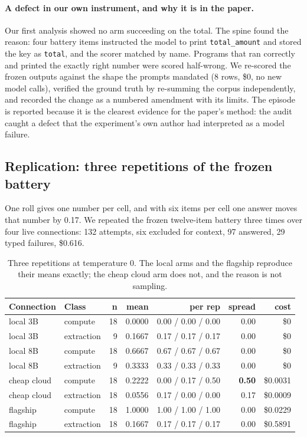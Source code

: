\documentclass[11pt]{article}
\newcommand{\code}[1]{\texttt{#1}}
\begin{document}
\paragraph{A defect in our own instrument, and why it is in the paper.} Our first analysis showed
no arm succeeding on the total. The spine found the reason: four battery items instructed the
model to print \code{total\_amount} and stored the key as \code{total}, and the scorer matched by
name. Programs that ran correctly and printed the exactly right number were scored half-wrong.
We re-scored the frozen outputs against the shape the prompts mandated (8 rows, \$0, no new model
calls), verified the ground truth by re-summing the corpus independently, and recorded the change
as a numbered amendment with its limits. The episode is reported because it is the clearest
evidence for the paper's method: the audit caught a defect that the experiment's own author had
interpreted as a model failure.

\subsection{Replication: three repetitions of the frozen battery}

One roll gives one number per cell, and with six items per cell one answer moves that number by
0.17. We repeated the frozen twelve-item battery three times over four live connections: 132
attempts, six excluded for context, 97 answered, 29 typed failures, \$0.616.

\begin{table}[h]
\centering
\small
\begin{tabular}{@{}llrrrrr@{}}
\toprule
\textbf{Connection} & \textbf{Class} & \textbf{n} & \textbf{mean} & \textbf{per rep} & \textbf{spread} & \textbf{cost} \\
\midrule
local 3B      & compute    & 18 & 0.0000 & 0.00 / 0.00 / 0.00 & 0.00 & \$0 \\
local 3B      & extraction &  9 & 0.1667 & 0.17 / 0.17 / 0.17 & 0.00 & \$0 \\
local 8B      & compute    & 18 & 0.6667 & 0.67 / 0.67 / 0.67 & 0.00 & \$0 \\
local 8B      & extraction &  9 & 0.3333 & 0.33 / 0.33 / 0.33 & 0.00 & \$0 \\
cheap cloud   & compute    & 18 & 0.2222 & 0.00 / 0.17 / 0.50 & \textbf{0.50} & \$0.0031 \\
cheap cloud   & extraction & 18 & 0.0556 & 0.17 / 0.00 / 0.00 & 0.17 & \$0.0009 \\
flagship      & compute    & 18 & 1.0000 & 1.00 / 1.00 / 1.00 & 0.00 & \$0.0229 \\
flagship      & extraction & 18 & 0.1667 & 0.17 / 0.17 / 0.17 & 0.00 & \$0.5891 \\
\bottomrule
\end{tabular}
\caption{Three repetitions at temperature 0. The local arms and the flagship reproduce their
means exactly; the cheap cloud arm does not, and the reason is not sampling.}
\end{table}
\end{document}
